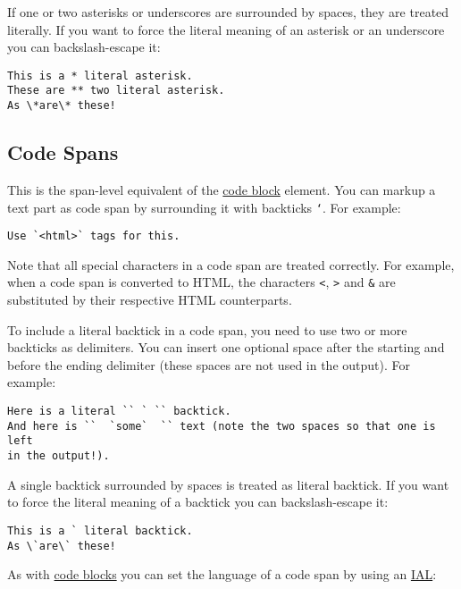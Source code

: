 \documentclass[a4paper]{article}
\begin{document}
If one or two asterisks or underscores are surrounded by spaces, they
are treated literally. If you want to force the literal meaning of an
asterisk or an underscore you can backslash-escape it:

\begin{verbatim}
This is a * literal asterisk.
These are ** two literal asterisk.
As \*are\* these!
\end{verbatim}

\hypertarget{code-spans}{\subsection{Code Spans}\label{code-spans}}

This is the span-level equivalent of the
\protect\hyperlink{code-blocks}{code block} element. You can markup a
text part as code span by surrounding it with backticks \texttt{`}. For
example:

\begin{verbatim}
Use `<html>` tags for this.
\end{verbatim}

Note that all special characters in a code span are treated correctly.
For example, when a code span is converted to HTML, the characters
\texttt{\textless{}}, \texttt{\textgreater{}} and \texttt{\&} are
substituted by their respective HTML counterparts.

To include a literal backtick in a code span, you need to use two or
more backticks as delimiters. You can insert one optional space after
the starting and before the ending delimiter (these spaces are not used
in the output). For example:

\begin{verbatim}
Here is a literal `` ` `` backtick.
And here is ``  `some`  `` text (note the two spaces so that one is left
in the output!).
\end{verbatim}

A single backtick surrounded by spaces is treated as literal backtick.
If you want to force the literal meaning of a backtick you can
backslash-escape it:

\begin{verbatim}
This is a ` literal backtick.
As \`are\` these!
\end{verbatim}

As with \protect\hyperlink{language-of-code-blocks}{code blocks} you can
set the language of a code span by using an
\protect\hyperlink{inline-attribute-lists}{IAL}:
\end{document}
